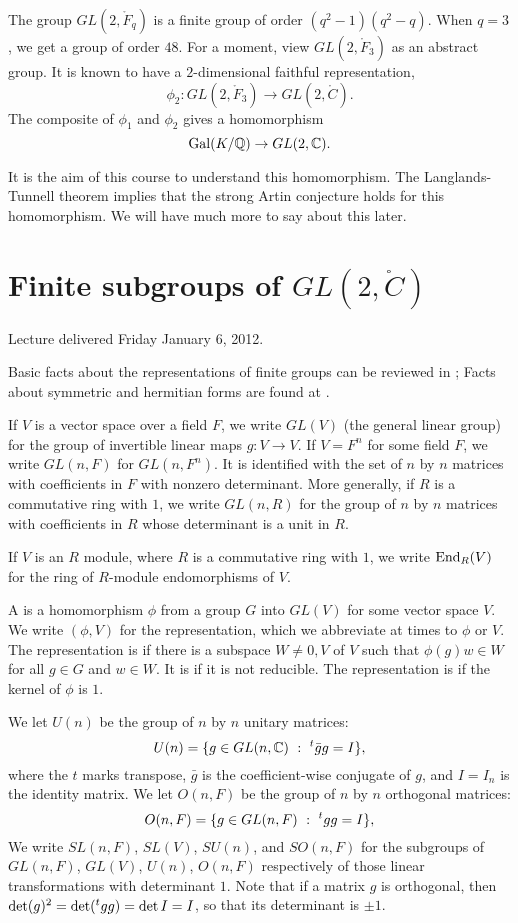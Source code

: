 \documentclass{amsart}
\def\t#1{\hbox{}^t#1}
\def\CC{\ring{C}}
\def\oG{\op{Gal}}
\begin{document}
The group $GL(2,\ring{F}_q)$ is a finite group of order
$(q^2-1)(q^2-q)$.  When $q=3$, we get a group of order $48$.  For a
moment, view $GL(2,\ring{F}_3)$ as an abstract group.  It is known
to have a $2$-dimensional faithful representation,
\[
\phi_2 : GL(2,\ring{F}_3) \to GL(2,\CC).
\]
The composite of $\phi_1$ and $\phi_2$ gives a homomorphism
\[
\oG(K/\ring{Q}) \to GL(2,\CC).
\]

It is the aim of this course to understand this homomorphism.  The
Langlands-Tunnell theorem implies that the strong Artin conjecture
holds for this homomorphism.  We will have much more to say about this
later.


\newpage
\section{Finite subgroups of $GL(2,\CC)$}

Lecture delivered Friday January 6, 2012.


Basic facts about the representations of finite groups can be reviewed
in \cite[p.~326, Sec. VII.4]{knapp-basic}; Facts about symmetric and
hermitian 
forms are found at \cite[p.~250,~Sec.~VI.2,~VI.4]{knapp-basic}.

If $V$ is a vector space over a field $F$, we write $GL(V)$ (the
general linear group) for the group of invertible linear maps $g:V\to
V$.  If $V=F^n$ for some field $F$, we write $GL(n,F)$ for
$GL(n,F^n)$.  It is identified with the set of $n$ by $n$ matrices
with coefficients in $F$ with nonzero determinant.  More generally, if
$R$ is a commutative ring with $1$, we write $GL(n,R)$ for the group
of $n$ by $n$ matrices with coefficients in $R$ whose determinant is a
unit in $R$.

If $V$ is an $R$ module, where $R$ is a commutative ring with $1$, 
we write ${\operatorname{End}}_R(V)$ for the ring of $R$-module endomorphisms of $V$.

A  is a homomorphism $\phi$ from a group $G$
into $GL(V)$ for some vector space $V$.  We write $(\phi,V)$ for the
representation, which we abbreviate at times to $\phi$ or $V$.  
The representation is  if there is
a subspace $W\ne 0,V$ of $V$ such that $\phi(g)w\in W$ for all $g\in
G$ and $w\in W$.  It is  if it is not reducible.
The representation is  if the kernel of $\phi$ is
$1$.

We let $U(n)$ be the group of $n$ by $n$ unitary matrices:
\[
U(n) = \{ g \in GL(n,\CC)  \mid \t{\bar g} g = I\},
\]
where the $t$ marks transpose, $\bar g$ is the coefficient-wise
conjugate of $g$, and $I=I_n$ is the identity matrix.  We let $O(n,F)$
be the group of $n$ by $n$ orthogonal matrices:
\[
O(n,F) = \{ g \in GL(n,F) \mid \t{g} g = I\},
\]
We write $SL(n,F)$, $SL(V)$, $SU(n)$, and $SO(n,F)$ for the subgroups
of $GL(n,F)$, $GL(V)$, $U(n)$, $O(n,F)$ respectively of those linear
transformations with determinant $1$.  Note that if a matrix $g$ is orthogonal,
then $\det(g)^2 = \det(\t{g}g) = \det{I} = I$, so that its determinant is $\pm 1$.
\end{document}
